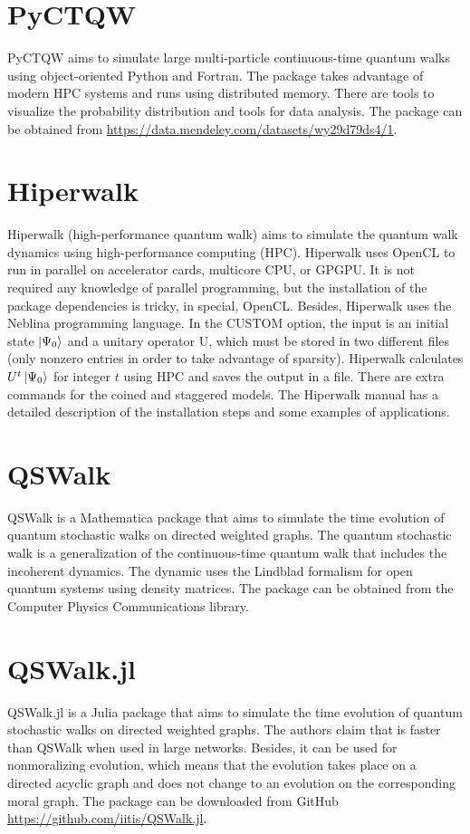 \section{PyCTQW}

PyCTQW aims to simulate large multi-particle continuous-time quantum walks using object-oriented Python and Fortran. The package takes advantage of modern HPC systems and runs using distributed memory. There are tools to visualize the probability distribution and tools for data analysis. The package can be obtained from \url{https://data.mendeley.com/datasets/wy29d79ds4/1}.

\section{Hiperwalk}

Hiperwalk (high-performance quantum walk) aims to simulate the quantum walk dynamics using high-performance computing (HPC). Hiperwalk uses OpenCL to run in parallel on accelerator cards, multicore CPU, or GPGPU. It is not required any knowledge of parallel programming, but the installation of the package dependencies is tricky, in special, OpenCL. Besides, Hiperwalk uses the Neblina programming language. In the CUSTOM option, the input is an initial state $\ket{\Psi_0}$ and a unitary operator U, which must be stored in two different files (only nonzero entries in order to take advantage of sparsity). Hiperwalk calculates $U^t\ket{\Psi_0}$ for integer $t$ using HPC and saves the output in a file. There are extra commands for the coined and staggered models. The Hiperwalk manual has a detailed description of the installation steps and some examples of applications.

\section{QSWalk}

QSWalk is a Mathematica package that aims to simulate the time evolution of quantum stochastic walks on directed weighted graphs. The quantum stochastic walk is a generalization of the continuous-time quantum walk that includes the incoherent dynamics. The dynamic uses the Lindblad formalism for open quantum systems using density matrices. The package can be obtained from the Computer Physics Communications library.


\section{QSWalk.jl}

QSWalk.jl is a Julia package that aims to simulate the time evolution of quantum stochastic walks on directed weighted graphs. The authors claim that is faster than QSWalk when used in large networks. Besides, it can be used for nonmoralizing evolution, which means that the evolution takes place on a directed acyclic graph and does not change to an evolution on the corresponding moral graph. The package can be downloaded from GitHub \url{https://github.com/iitis/QSWalk.jl}.